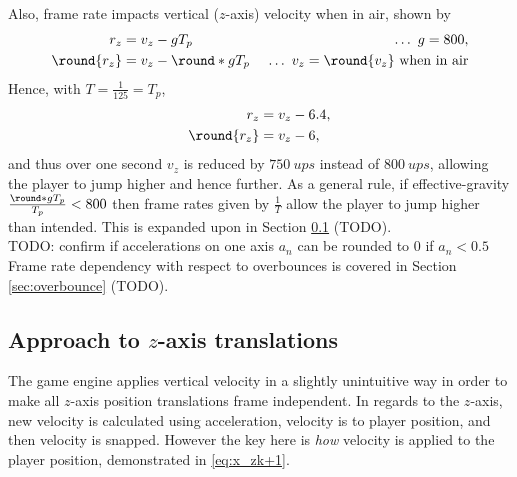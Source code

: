 Also, frame rate impacts vertical ($z$-axis) velocity when in air, shown by
\begin{align*}
r_z &= v_z - gT_p\ &\ldots\ g = 800,\\
\round{r_z} &= v_z - \round*{gT_p}\ &\ldots\ v_z = \round{v_z}\ \text{when in air}
\end{align*}
Hence, with $T = \frac{1}{125} = T_p$,
\begin{align*}
r_z &= v_z - 6.4,\\
\round{r_z} &= v_z - 6,
\end{align*}
and thus over one second $v_z$ is reduced by $\qty{750}{ups}$ instead of $\qty{800}{ups}$, allowing the player to jump higher and hence further.
As a general rule, if effective-gravity $\frac{\round*{gT_p}}{T_p} < 800$ then frame rates given by $\frac{1}{T}$ allow the player to jump higher than intended.
This is expanded upon in Section \ref{sec:x_z} (TODO).\\

%
TODO: confirm if accelerations on one axis $a_n$ can be rounded to 0 if $a_n < 0.5$\\
%

Frame rate dependency with respect to overbounces is covered in Section \ref{sec:overbounce} (TODO).


\subsection{Approach to $z$-axis translations}
\label{sec:x_z}
The game engine applies vertical velocity in a slightly unintuitive way in order to make all $z$-axis position translations frame independent.
In regards to the $z$-axis, new velocity is calculated using acceleration, velocity is to player position, and then velocity is snapped.
However the key here is \emph{how} velocity is applied to the player position, demonstrated in \eqref{eq:x_zk+1}.

